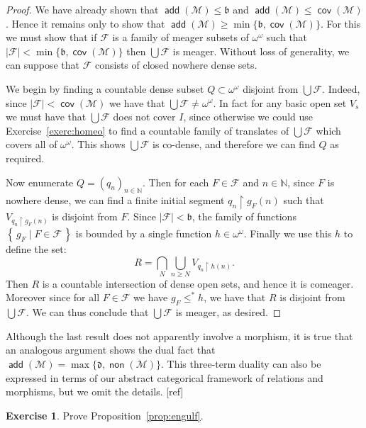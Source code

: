 \documentclass[11pt,oneside,a4paper]{amsbook}
\newcommand{\set}[1]{\left\{\,#1\,\right\}}
\newcommand{\N}{\mathbb N}
\newcommand{\Meager}{\mathcal M}
\DeclareMathOperator{\add}{\mathsf{add}}
\DeclareMathOperator{\non}{\mathsf{non}}
\DeclareMathOperator{\cov}{\mathsf{cov}}
\theoremstyle{definition}
\newtheorem{exercise}{Exercise}[section]
\theoremstyle{plain}
\theoremstyle{definition}
\theoremstyle{remark}
\numberwithin{equation}{section}
\numberwithin{figure}{section}
\begin{document}
\begin{proof}
  We have already shown that $\add(\Meager)\leq\mathfrak b$ and $\add(\Meager)\leq\cov(\Meager)$. Hence it remains only to show that $\add(\Meager)\geq\min\{\mathfrak b,\cov(\Meager)\}$. For this we must show that if $\mathcal F$ is a family of meager subsets of $\omega^\omega$ such that $|\mathcal F|<\min\{\mathfrak b,\cov(\Meager)\}$ then $\bigcup\mathcal F$ is meager. Without loss of generality, we can suppose that $\mathcal F$ consists of closed nowhere dense sets.

  We begin by finding a countable dense subset $Q\subset\omega^\omega$ disjoint from $\bigcup\mathcal F$. Indeed, since $|\mathcal F|<\cov(\Meager)$ we have that $\bigcup\mathcal F\neq\omega^\omega$. In fact for any basic open set $V_s$ we must have that $\bigcup\mathcal F$ does not cover $I$, since otherwise we could use Exercise~\ref{exerc:homeo} to find a countable family of translates of $\bigcup\mathcal F$ which covers all of $\omega^\omega$. This shows $\bigcup\mathcal F$ is co-dense, and therefore we can find $Q$ as required.

  Now enumerate $Q=(q_n)_{n\in\N}$. Then for each $F\in\mathcal F$ and $n\in\N$, since $F$ is nowhere dense, we can find a finite initial segment $q_n\restriction g_F(n)$ such that $V_{q_n\restriction g_F(n)}$ is disjoint from $F$. Since $|\mathcal F|<\mathfrak b$, the family of functions $\set{g_F\mid F\in\mathcal F}$ is bounded by a single function $h\in\omega^\omega$. Finally we use this $h$ to define the set:
  \[R=\bigcap_N\bigcup_{n\geq N}V_{q_n\restriction h(n)}\text{.}
  \]
  Then $R$ is a countable intersection of dense open sets, and hence it is comeager. Moreover since for all $F\in\mathcal F$ we have $g_F\leq^*h$, we have that $R$ is disjoint from $\bigcup\mathcal F$. We can thus conclude that $\bigcup\mathcal F$ is meager, as desired.
\end{proof}

Although the last result does not apparently involve a morphism, it is true that an analogous argument shows the dual fact that $\add(\Meager)=\max\{\mathfrak d,\non(\Meager)\}$. This three-term duality can also be expressed in terms of our abstract categorical framework of relations and morphisms, but we omit the details. [ref]

\begin{exercise}
  \label{exerc:engulf}
  Prove Proposition~\ref{prop:engulf}.
\end{exercise}
\end{document}
